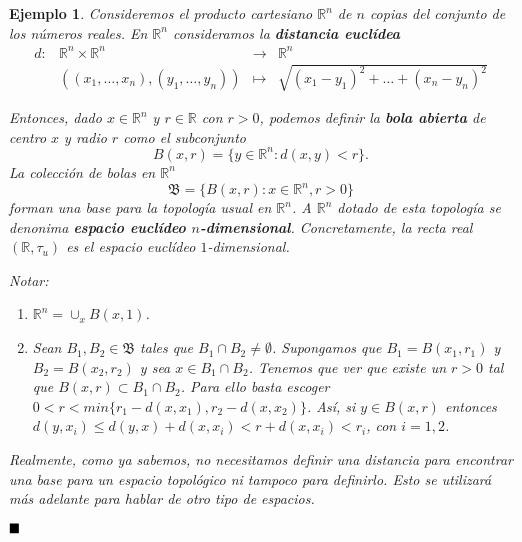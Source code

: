 \documentclass[12pt]{article}
\newtheorem{example}{Ejemplo}[theorem]
\begin{document}
\begin{example}Consideremos el producto cartesiano $\mathbb{R}^n$ de $n$ copias del conjunto de los números reales. En $\mathbb{R}^n$ consideramos la \textbf{distancia euclídea} $$
\begin{array}{rccl}
d \colon &\mathbb{R}^n \times \mathbb{R}^n & \longrightarrow & \mathbb{R}^n\\
&((x_1, \ldots, x_n),(y_1, \ldots, y_n))& \longmapsto &\sqrt{(x_1-y_1)^2+\ldots+(x_n-y_n)^2}
\end{array}
$$

Entonces, dado $x \in \mathbb{R}^n$ y $r \in \mathbb{R}$ con $r>0$, podemos definir la \textbf{bola abierta} de centro $x$ y radio $r$ como el subconjunto $$B(x,r) = \lbrace y \in \mathbb{R}^n: d(x,y) <r \rbrace.$$ La colección de bolas en $\mathbb{R}^n$ $$\mathfrak{B} = \lbrace B(x,r) :x \in \mathbb{R}^n, r>0 \rbrace$$ forman una base para la topología usual en $\mathbb{R}^n$. A $\mathbb{R}^n$ dotado de esta topología se denonima \textbf{espacio euclídeo $n$-dimensional}. Concretamente, la recta real $(\mathbb{R}, \tau_u)$ es el espacio euclídeo $1$-dimensional.

Notar: 
\begin{enumerate}
\item $\mathbb{R}^n = \cup_x B(x,1)$.
\item Sean $B_1, B_2 \in \mathfrak{B}$ tales que $B_1 \cap B_2 \neq \emptyset$. Supongamos que $B_1 = B(x_1,r_1)$ y $B_2 = B(x_2,r_2)$ y sea $x \in B_1 \cap B_2$. Tenemos que ver que existe un $r>0$ tal que $B(x,r) \subset B_1 \cap B_2$. Para ello basta escoger $0 < r< min\lbrace	r_1-d(x,x_1), r_2-d(x,x_2)\rbrace$. Así, si $y \in B(x,r)$ entonces $d(y,x_i) \leq d(y,x) + d(x,x_i) <r + d(x,x_i)<r_i$, con $i=1,2$.
\end{enumerate}

Realmente, como ya sabemos, no necesitamos definir una distancia para encontrar una base para un espacio topológico ni tampoco para definirlo. Esto se utilizará más adelante para hablar de otro tipo de espacios.
\end{example}

$\hfill \blacksquare$
\end{document}
